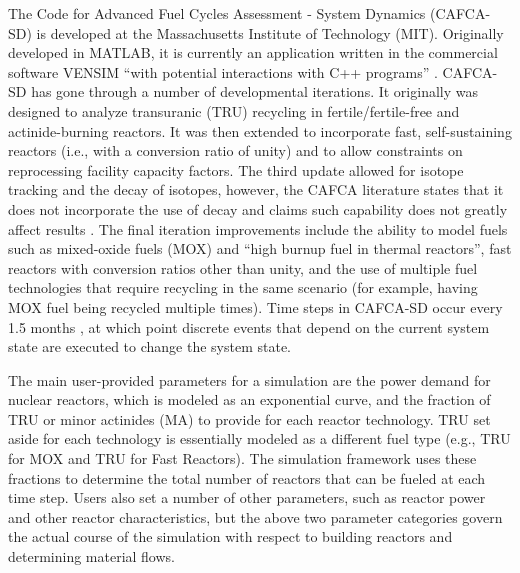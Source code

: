 The Code for Advanced Fuel Cycles Assessment - System Dynamics (CAFCA-SD) is
developed at the Massachusetts Institute of Technology (MIT). Originally
developed in MATLAB, it is currently an application written in the commercial
software VENSIM \cite{vensim_2010_ventana} ``with potential interactions with
C++ programs'' \cite{guerin_benchmark_2009}. CAFCA-SD has gone through a number
of developmental iterations. It originally was designed to analyze transuranic
(TRU) recycling in fertile/fertile-free and actinide-burning reactors. It was
then extended to incorporate fast, self-sustaining reactors (i.e., with a
conversion ratio of unity) and to allow constraints on reprocessing facility
capacity factors. The third update allowed for isotope tracking and the decay of
isotopes, however, the CAFCA literature states that it does not incorporate the
use of decay and claims such capability does not greatly affect results
\cite{guerin_impact_2009,guerin_benchmark_2009}. The final iteration
improvements include the ability to model fuels such as mixed-oxide fuels (MOX)
and ``high burnup fuel in thermal reactors'', fast reactors with conversion
ratios other than unity, and the use of multiple fuel technologies that require
recycling in the same scenario (for example, having MOX fuel being recycled
multiple times). Time steps in CAFCA-SD occur every 1.5
months \cite{guerin_impact_2009}, at which point discrete events that depend on
the current system state are executed to change the system state.

The main user-provided parameters for a simulation are the power demand for
nuclear reactors, which is modeled as an exponential curve, and the fraction of
TRU or minor actinides (MA) to provide for each reactor technology. TRU set
aside for each technology is essentially modeled as a different fuel type (e.g.,
TRU for MOX and TRU for Fast Reactors). The simulation framework uses these
fractions to determine the total number of reactors that can be fueled at each
time step. Users also set a number of other parameters, such as reactor power
and other reactor characteristics, but the above two parameter categories govern
the actual course of the simulation with respect to building reactors and
determining material flows. 

